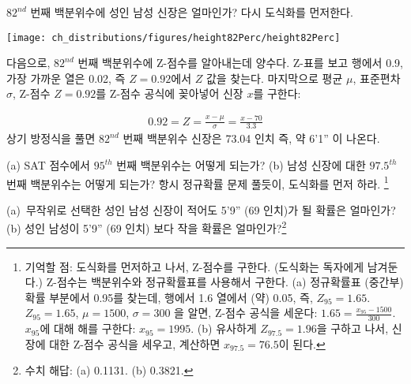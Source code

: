 \begin{example}{$82^{nd}$ 번째 백분위수에 성인 남성 신장은 얼마인가?}
다시 도식화를 먼저한다. \textC{\vspace{-3mm}}
\begin{center}
\texttt{[image: ch\_distributions/figures/height82Perc/height82Perc]}\textC{\vspace{-1mm}}
\end{center}
다음으로, $82^{nd}$ 번째 백분위수에 Z-점수를 알아내는데 양수다. Z-표를 보고 행에서 0.9, 가장 가까운 열은 0.02, 즉 $Z=0.92$에서 $Z$ 값을 찾는다. 마지막으로 평균 $\mu$, 표준편차 $\sigma$, Z-점수 $Z=0.92$를 Z-점수 공식에 꽂아넣어 신장 $x$를 구한다:

\begin{eqnarray*}
0.92 = Z = \frac{x-\mu}{\sigma} = \frac{x - 70}{3.3}
\end{eqnarray*}
상기 방정식을 풀면 $82^{nd}$ 번째 백분위수 신장은 73.04 인치 즉, 약 6'1'' 이 나온다.
\end{example}

\begin{exercise}
(a) SAT 점수에서 $95^{th}$ 번째 백분위수는 어떻게 되는가? (b) 남성 신장에 대한 $97.5^{th}$ 번째 백분위수는 어떻게 되는가? 항시 정규확률 문제 풀듯이, 도식화를 먼저 하라. \footnote{기억할 점: 도식화를 먼저하고 나서, Z-점수를 구한다. (도식화는 독자에게 남겨둔다.) Z-점수는 백분위수와 정규확률표를 사용해서 구한다. (a) 정규확률표 (중간부) 확률 부분에서 0.95를 찾는데, 행에서 1.6 열에서 (약) 0.05, 즉, $Z_{95}=1.65$. $Z_{95}=1.65$, $\mu = 1500$, $\sigma = 300$ 을 알면, Z-점수 공식을 세운다: $1.65 = \frac{x_{95} - 1500}{300}$. $x_{95}$에 대해 해를 구한다: $x_{95} = 1995$. (b) 유사하게 $Z_{97.5} = 1.96$을 구하고 나서, 신장에 대한 Z-점수 공식을 세우고, 계산하면 $x_{97.5} = 76.5$이 된다.}
\end{exercise}

\begin{exercise}\label{more74Less69}
(a)~무작위로 선택한 성인 남성 신장이 적어도 5'9'' (69 인치)가 될 확률은 얼마인가? (b) 성인 남성이 5'9'' (69 인치) 보다 작을 확률은 얼마인가?\footnote{수치 해답: (a) 0.1131. (b) 0.3821.}
\end{exercise}

